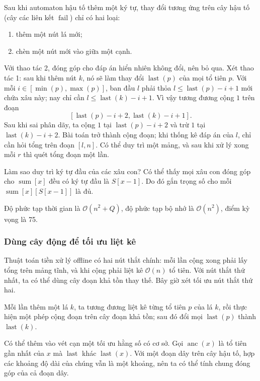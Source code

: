 \documentclass[11pt]{article}
\newcommand{\Oh}{\mathcal{O}}
\begin{document}
Sau khi automaton hậu tố thêm một ký tự, thay đổi tương ứng trên cây hậu tố
(cây các liên kết \(\operatorname{fail}\)) chỉ có hai loại:
\begin{enumerate}
  \item thêm một nút lá mới;
  \item chèn một nút mới vào giữa một cạnh.
\end{enumerate}
Với thao tác 2, đóng góp cho đáp án hiển nhiên không đổi, nên bỏ qua. Xét thao
tác 1: sau khi thêm nút \(k\), nó sẽ làm thay đổi \(\operatorname{last}(p)\)
của mọi tổ tiên \(p\). Với mỗi \(i\in[\min(p),\max(p)]\), ban đầu \(l\) phải
thỏa \(l\le \operatorname{last}(p)-i+1\) mới chứa xâu này; nay chỉ cần
\(l\le \operatorname{last}(k)-i+1\). Vì vậy tương đương cộng \(1\) trên đoạn
\[
  [\operatorname{last}(p)-i+2,\operatorname{last}(k)-i+1].
\]
Sau khi sai phân dãy, ta cộng \(1\) tại \(\operatorname{last}(p)-i+2\) và trừ
\(1\) tại \(\operatorname{last}(k)-i+2\). Bài toán trở thành cộng đoạn; khi
thống kê đáp án của \(l\), chỉ cần hỏi tổng trên đoạn \([l,n]\). Có thể duy trì
một mảng, và sau khi xử lý xong mỗi \(r\) thì quét tổng đoạn một lần.

Làm sao duy trì ký tự đầu của các xâu con? Có thể thấy mọi xâu con đóng góp
cho \(\operatorname{sum}[x]\) đều có ký tự đầu là \(S[x-1]\). Do đó gắn trọng
số cho mỗi \(\operatorname{sum}[x][S[x-1]]\) là đủ.

Độ phức tạp thời gian là \(\Oh(n^2+Q)\), độ phức tạp bộ nhớ là \(\Oh(n^2)\),
điểm kỳ vọng là 75.

\subsubsection{Dùng cây động để tối ưu liệt kê}

Thuật toán tiền xử lý offline có hai nút thắt chính: mỗi lần cộng xong phải
lấy tổng trên mảng tĩnh, và khi cộng phải liệt kê \(\Oh(n)\) tổ tiên. Với nút
thắt thứ nhất, ta có thể dùng cây đoạn khả tồn thay thế. Bây giờ xét tối ưu
nút thắt thứ hai.

Mỗi lần thêm một lá \(k\), ta tương đương liệt kê từng tổ tiên \(p\) của lá
\(k\), rồi thực hiện một phép cộng đoạn trên cây đoạn khả tồn; sau đó đổi mọi
\(\operatorname{last}(p)\) thành \(\operatorname{last}(k)\).

Có thể thêm vào vét cạn một tối ưu hằng số có cơ sở. Gọi \(\operatorname{anc}(x)\)
là tổ tiên gần nhất của \(x\) mà \(\operatorname{last}\) khác
\(\operatorname{last}(x)\). Với một đoạn dây trên cây hậu tố, hợp các khoảng độ
dài của chúng vẫn là một khoảng, nên ta có thể tính chung đóng góp của cả đoạn
dây.
\end{document}
